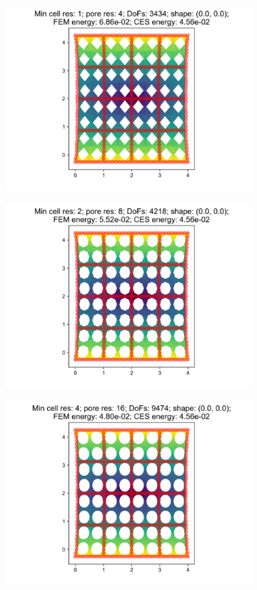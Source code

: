 \begin{figure}[H]
\begin{subfigure}{.45\textwidth}
  \centering
  \includegraphics[width=.8\linewidth]{lces/vis_tension/bm_4_mesh_0.png}
\end{subfigure}
\begin{subfigure}{.45\textwidth}
  \centering
  \includegraphics[width=.8\linewidth]{lces/vis_tension/bm_4_mesh_1.png}
\end{subfigure}
\newline
\begin{subfigure}{.45\textwidth}
  \centering
  \includegraphics[width=.8\linewidth]{lces/vis_tension/bm_4_mesh_2.png}

\end{subfigure}
\end{figure}
